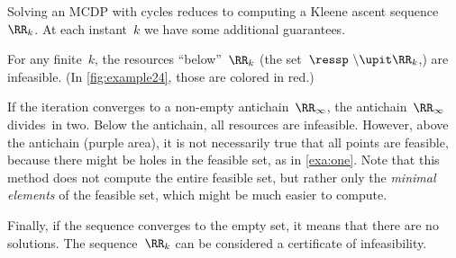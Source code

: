 Solving an MCDP with cycles reduces to computing a Kleene ascent sequence~$\RR_{k}$.
At each instant~$k$ we have some additional guarantees.

For any finite~$k$, the resources ``below''~$\RR_{k}$ (the set~$\ressp\ \backslash\upit\RR_{k}$,) are infeasible.
(In \cref{fig:example24}, those are colored in red.)

If the iteration converges to a non-empty antichain~$\RR_{\infty}$, the antichain~$\RR_{\infty}$ divides~\ressp in two.
Below the antichain, all resources are infeasible.
However, above the antichain (purple area), it is not necessarily true that all points are feasible, because there might be holes in the feasible set, as in \cref{exa:one}.
Note that this method does not compute the entire feasible set, but rather only the \emph{minimal elements} of the feasible set, which might be much easier to compute.

Finally, if the sequence converges to the empty set, it means that there are no solutions.
The sequence~$\RR_{k}$ can be considered a certificate of infeasibility.

